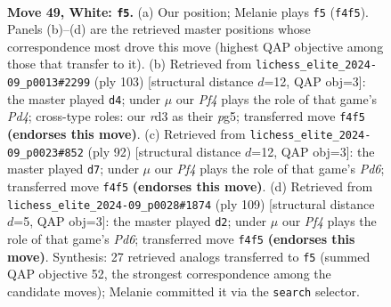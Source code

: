 \documentclass[11pt]{article}
\begin{document}
\clearpage

\begin{figure}[p]\centering
\begin{subfigure}{0.46\textwidth}\centering
\resizebox{\linewidth}{!}{%
\newchessgame
\chessboard[
  setfen={8/p2p4/2p5/4K2k/5P2/3r4/8/8 w - - 1 49},
  showmover=false,
  pgfstyle=straightmove, color=movearrow, markmove={f4-f5}
]}
\caption{}
\end{subfigure}\hfill
\begin{subfigure}{0.46\textwidth}\centering
\resizebox{\linewidth}{!}{%
\newchessgame
\chessboard[
  setfen={8/8/8/p2p1KP1/2k5/P7/8/8 b - - 0 52},
  showmover=false,
  pgfstyle=straightmove, color=movearrow, markmove={d5-d4}
]}
\caption{}
\end{subfigure}
\\[4pt]
\begin{subfigure}{0.46\textwidth}\centering
\resizebox{\linewidth}{!}{%
\newchessgame
\chessboard[
  setfen={5k2/2K2p2/3P2p1/4P3/8/8/8/7r w - - 2 47},
  showmover=false,
  pgfstyle=straightmove, color=movearrow, markmove={d6-d7}
]}
\caption{}
\end{subfigure}\hfill
\begin{subfigure}{0.46\textwidth}\centering
\resizebox{\linewidth}{!}{%
\newchessgame
\chessboard[
  setfen={8/1R6/p7/2P5/1P6/3p2K1/2k5/8 b - - 0 55},
  showmover=false,
  pgfstyle=straightmove, color=movearrow, markmove={d3-d2}
]}
\caption{}
\end{subfigure}
\caption{\textbf{Move 49, White: \texttt{f5}.} (a) Our position; Melanie plays \texttt{f5} (\texttt{f4f5}). Panels (b)--(d) are the retrieved master positions whose correspondence most drove this move (highest QAP objective among those that transfer to it). (b) Retrieved from \texttt{lichess\_elite\_2024-09\_p0013\#2299} (ply 103) [structural distance $d$=12, QAP obj=3]: the master played \texttt{d4}; under $\mu$ our \emph{Pf4} plays the role of that game's \emph{Pd4}; cross-type roles: our \emph{r}d3 as their \emph{p}g5; transferred move \texttt{f4f5} \textbf{(endorses this move)}. (c) Retrieved from \texttt{lichess\_elite\_2024-09\_p0023\#852} (ply 92) [structural distance $d$=12, QAP obj=3]: the master played \texttt{d7}; under $\mu$ our \emph{Pf4} plays the role of that game's \emph{Pd6}; transferred move \texttt{f4f5} \textbf{(endorses this move)}. (d) Retrieved from \texttt{lichess\_elite\_2024-09\_p0028\#1874} (ply 109) [structural distance $d$=5, QAP obj=3]: the master played \texttt{d2}; under $\mu$ our \emph{Pf4} plays the role of that game's \emph{Pd6}; transferred move \texttt{f4f5} \textbf{(endorses this move)}. Synthesis: 27 retrieved analogs transferred to \texttt{f5} (summed QAP objective 52, the strongest correspondence among the candidate moves); Melanie committed it via the \texttt{search} selector.}
\label{fig:thought-m96}
\end{figure}
\end{document}
